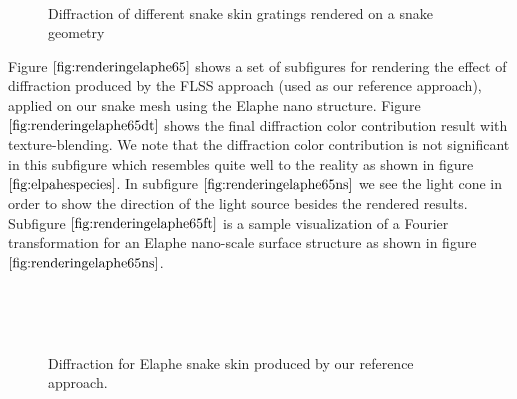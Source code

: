 \begin{figure}[H]
  \centering
~
~
  
\caption[Snake Renderings: Our Approaches applied on our Gratings]{Diffraction of different snake skin gratings rendered on a snake geometry}
\label{fig:renderingdifferentsnankegratings}
\end{figure}

Figure $\ref{fig:renderingelaphe65}$ shows a set of subfigures for rendering the effect of diffraction produced by the FLSS approach (used as our reference approach), applied on our snake mesh using the Elaphe nano structure. Figure $\ref{fig:renderingelaphe65dt}$ shows the final diffraction color contribution result with texture-blending. We note that the diffraction color contribution is not significant in this subfigure which resembles quite well to the reality as shown in figure $\ref{fig:elpahespecies}$. In subfigure $\ref{fig:renderingelaphe65ns}$ we see the light cone in order to show the direction of the light source besides the rendered results. Subfigure $\ref{fig:renderingelaphe65ft}$ is a sample visualization of a Fourier transformation for an Elaphe nano-scale surface structure as shown in figure $\ref{fig:renderingelaphe65ns}$.

\begin{figure}[H]
  \centering
~

~
~ 
  
\caption[Snake Renderings: FLSS Approach for Elaphe Grating]{Diffraction for Elaphe snake skin produced by our reference approach.}
\label{fig:renderingelaphe65}
\end{figure}


